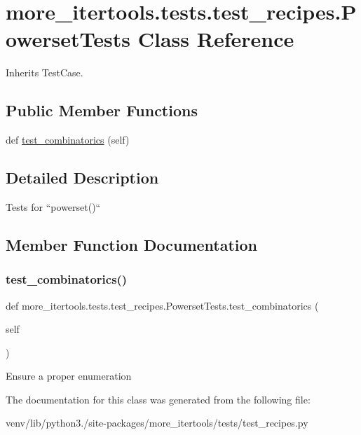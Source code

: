\hypertarget{classmore__itertools_1_1tests_1_1test__recipes_1_1_powerset_tests}{}\section{more\+\_\+itertools.\+tests.\+test\+\_\+recipes.\+Powerset\+Tests Class Reference}
\label{classmore__itertools_1_1tests_1_1test__recipes_1_1_powerset_tests}


Inherits Test\+Case.

\subsection*{Public Member Functions}
\begin{DoxyCompactItemize}
\item 
def \hyperlink{classmore__itertools_1_1tests_1_1test__recipes_1_1_powerset_tests_a0fa4df161c56f0f9324fbc9294e05976}{test\+\_\+combinatorics} (self)
\end{DoxyCompactItemize}


\subsection{Detailed Description}
\begin{DoxyVerb}Tests for ``powerset()``\end{DoxyVerb}
 

\subsection{Member Function Documentation}
\mbox{\label{classmore__itertools_1_1tests_1_1test__recipes_1_1_powerset_tests_a0fa4df161c56f0f9324fbc9294e05976}} 
\subsubsection{\texorpdfstring{test\+\_\+combinatorics()}{test\_combinatorics()}}
{\footnotesize\ttfamily def more\+\_\+itertools.\+tests.\+test\+\_\+recipes.\+Powerset\+Tests.\+test\+\_\+combinatorics (\begin{DoxyParamCaption}\item[{}]{self }\end{DoxyParamCaption})}

\begin{DoxyVerb}Ensure a proper enumeration\end{DoxyVerb}
 

The documentation for this class was generated from the following file\+:\begin{DoxyCompactItemize}
\item 
venv/lib/python3./site-\/packages/more\+\_\+itertools/tests/test\+\_\+recipes.\+py\end{DoxyCompactItemize}
